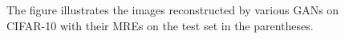 \begin{figure}[h]
{\begin{minipage}{0.25\linewidth}
\begin{center}
\end{center}
\end{minipage}}
   \caption{The figure illustrates the images reconstructed by various GANs on CIFAR-10 with their MREs on the test set in the parentheses. }\label{fig:reconstructed_cifar10}
\end{figure}

